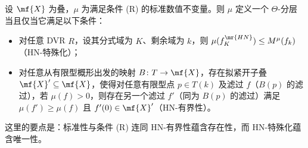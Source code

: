 \begin{thm}
    设 \(\mf{X}\) 为叠，\(\mu\) 为满足条件 (R) 的标准数值不变量。则 \(\mu\) 定义一个 \(\Theta\)-分层当且仅当它满足以下条件：
    \begin{itemize}
        \item 对任意 DVR \(R\)，设其分式域为 \(K\)、剩余域为 \(k\)，则 \(\mu(f_K^{\mr{HN}}) \leq M^{\mu}(f_k)\)（HN-特殊化）；
        \item 对任意从有限型概形出发的映射 \(B \colon T \to \mf{X}\)，存在拟紧开子叠 \(\mf{X}' \subseteq \mf{X}\)，使得对任意有限型点 \(p \in T(k)\) 及滤过 \(f\)（\(B(p)\) 的滤过），若 \(\mu(f) > 0\)，则存在另一个滤过 \(f'\)（同为 \(B(p)\) 的滤过）满足 \(\mu(f') \geq \mu(f)\) 且 \(f'(0) \in \mf{X}'\)（HN-有界性）。
    \end{itemize}
\end{thm}

这里的要点是：标准性与条件 (R) 连同 HN-有界性蕴含存在性，而 HN-特殊化蕴含唯一性。



